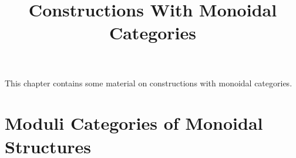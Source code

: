 

%



\title{Constructions With Monoidal Categories}

\maketitle

\label{section-phantom}

This chapter contains some material on constructions with monoidal categories.

\ChapterTableOfContents

\section{Moduli Categories of Monoidal Structures}\label{section-moduli-categories-of-monoidal-structures}
